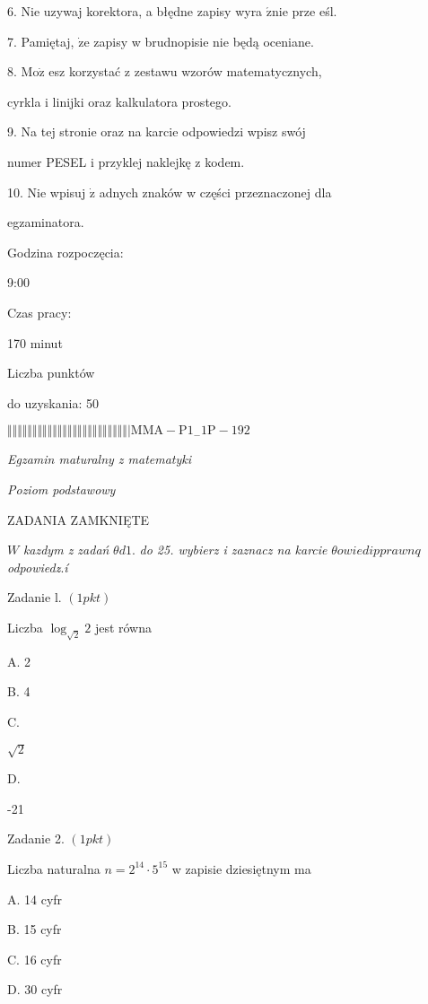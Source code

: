 \documentclass[a4paper,12pt]{article}
\begin{document}
6. Nie uzywaj korektora, a błędne zapisy wyra $\acute{\mathrm{z}}\mathrm{n}\mathrm{i}\mathrm{e}$ prze eśl.

7. Pamiętaj, $\dot{\mathrm{z}}\mathrm{e}$ zapisy w brudnopisie nie będą oceniane.

8. $\mathrm{M}\mathrm{o}\dot{\mathrm{z}}$ esz korzystać z zestawu wzorów matematycznych,

cyrkla i linijki oraz kalkulatora prostego.

9. Na tej stronie oraz na karcie odpowiedzi wpisz swój

numer PESEL i przyklej naklejkę z kodem.

10. Nie wpisuj $\dot{\mathrm{z}}$ adnych znaków w części przeznaczonej dla

egzaminatora.

Godzina rozpoczęcia:

9:00

Czas pracy:

170 minut

Liczba punktów

do uzyskania: 50

$\Vert\Vert\Vert\Vert\Vert\Vert\Vert\Vert\Vert\Vert\Vert\Vert\Vert\Vert\Vert\Vert\Vert\Vert\Vert\Vert\Vert\Vert\Vert\Vert|  \mathrm{M}\mathrm{M}\mathrm{A}-\mathrm{P}1_{-}1\mathrm{P}-192$




{\it Egzamin maturalny z matematyki}

{\it Poziom podstawowy}

ZADANIA ZAMKNIĘTE

$W$ {\it kazdym z zadań} $\theta d1.$ {\it do 25. wybierz i zaznacz na karcie} $\theta owiedipprawnq$ {\it odpowiedz}$\acute{}$.{\it í}

Zadanie l. $(1pkt)$

Liczba $\log_{\sqrt{2}}2$ jest równa

A. 2

B. 4

C.

$\sqrt{2}$

D.

-21

Zadanie 2. $(1pkt)$

Liczba naturalna $n=2^{14}\cdot 5^{15}$ w zapisie dziesiętnym ma

A. 14 cyfr

B. 15 cyfr

C. 16 cyfr

D. 30 cyfr
\end{document}
